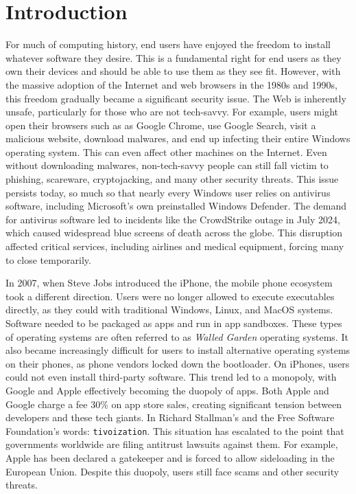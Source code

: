 \section{Introduction}
\label{sec:intro}

For much of computing history, end users have enjoyed the freedom to install whatever software they desire. This is a fundamental right for end users as they own their devices and should be able to use them as they see fit. However, with the massive adoption of the Internet and web browsers in the 1980s and 1990s, this freedom gradually became a significant security issue. The Web is inherently unsafe, particularly for those who are not tech-savvy. For example, users might open their browsers such as as Google Chrome, use Google Search, visit a malicious website, download malwares, and end up infecting their entire Windows operating system\cite{microsoftPreventMalware}. This can even affect other machines on the Internet. Even without downloading malwares, non-tech-savvy people can still fall victim to phishing\cite{microsoftPhishingTrends}, scareware, cryptojacking, and many other security threats. This issue persists today, so much so that nearly every Windows user relies on antivirus software, including Microsoft's own preinstalled Windows Defender. The demand for antivirus software led to incidents like the CrowdStrike outage in July 2024, which caused widespread blue screens of death across the globe. This disruption affected critical services, including airlines and medical equipment, forcing many to close temporarily\cite{wikipedia2024crowdstrike}.

In 2007, when Steve Jobs introduced the iPhone, the mobile phone ecosystem took a different direction. Users were no longer allowed to execute executables directly, as they could with traditional Windows, Linux, and MacOS systems. Software needed to be packaged as apps and run in app sandboxes. These types of operating systems are often referred to as \textit{Walled Garden} operating systems. It also became increasingly difficult for users to install alternative operating systems on their phones, as phone vendors locked down the bootloader\cite{melontini2025bootloader}. On iPhones, users could not even install third-party software\cite{apple2021trusted}. This trend led to a monopoly, with Google and Apple effectively becoming the duopoly of apps. Both Apple and Google charge a fee 30\% on app store sales, creating significant tension between developers and these tech giants\cite{FreeBSDfan2024, haney2023users}. In Richard Stallman's and the Free Software Foundation's words: \texttt{tivoization}\cite{GNUtivoization}.  This situation has escalated to the point that governments worldwide are filing antitrust lawsuits against them\cite{usdoj2024apple,europa2024apple,samr2025google}. For example, Apple has been declared a gatekeeper and is forced to allow sideloading in the European Union\cite{europa2024apple}. Despite this duopoly, users still face scams and other security threats\cite{10.1145/3548606.3560615, 10.1145/2484313.2484316}.

